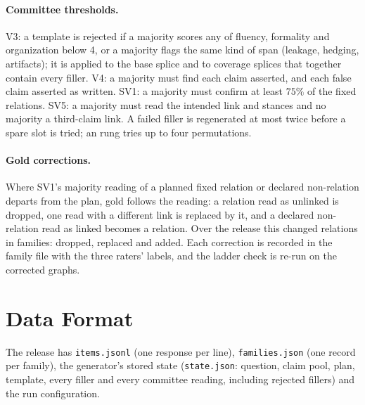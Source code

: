 \paragraph{Committee thresholds.} V3: a template is rejected if a majority scores any of fluency,
formality and organization below 4, or a majority flags the same kind of span (leakage, hedging,
artifacts); it is applied to the base splice and to coverage splices that together contain every
filler. V4: a majority must find each claim asserted, and each false claim asserted as written.
SV1: a majority must confirm at least $75\%$ of the fixed relations. SV5: a majority must read the
intended link and stances and no majority a third-claim link. A failed filler is regenerated at
most twice before a spare slot is tried; an  rung tries up to four permutations.

\paragraph{Gold corrections.} Where SV1's majority reading of a planned fixed relation or declared
non-relation departs from the plan, gold follows the reading: a relation read as unlinked is
dropped, one read with a different link is replaced by it, and a declared non-relation read as
linked becomes a relation. Over the release this changed \lbGoldCorr{} relations in
\lbGoldCorrFamilies{} families: \lbGoldCorrDropped{} dropped, \lbGoldCorrReplaced{} replaced and
\lbGoldCorrAdded{} added. Each correction is recorded in the family file with the three raters'
labels, and the ladder check is re-run on the corrected graphs.

\section{Data Format}
\label{app:schema}

The release has \texttt{items.jsonl} (one response per line), \texttt{families.json} (one record
per family), the generator's stored state (\texttt{state.json}: question, claim pool, plan,
template, every filler and every committee reading, including rejected fillers) and the run
configuration.

